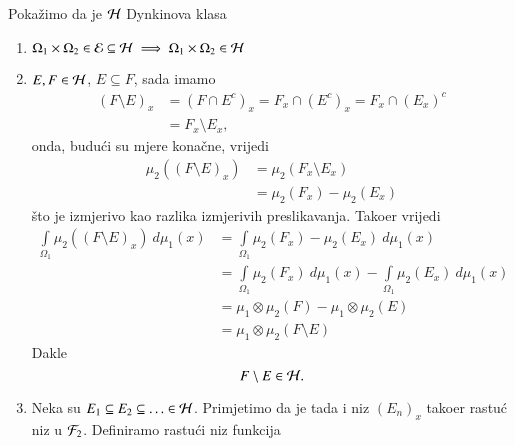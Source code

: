 \begin{rj}[\ref{zad:4.15}]
    Poka\v zimo da je $\mathcal{H}$ Dynkinova klasa
    \begin{enumerate}[label=(\roman*)]
        \item
        $\Omega_1 \times \Omega_2 \in \mathcal{E} \subseteq \mathcal{H} \implies \Omega_1 \times \Omega_2 \in \mathcal{H}$
        \item $E, F \in \mathcal{H}$, $E \subseteq F$, sada imamo
        \begin{equation*}
            \begin{aligned}
                (F \setminus E)_x &= (F \cap E^c)_x = F_x \cap (E^c)_x = F_x \cap (E_x)^c\\
                &= F_x \setminus E_x,
            \end{aligned}
        \end{equation*}
        onda, budu\' ci su mjere kona\v cne, vrijedi
        \begin{equation*}
            \begin{aligned}
                \mu_2 ((F \setminus E)_x) &= \mu_2 (F_x \setminus E_x)\\
                &= \mu_2 (F_x) - \mu_2 (E_x)
            \end{aligned}
        \end{equation*}
        \v sto je izmjerivo kao razlika izmjerivih preslikavanja.
        Tako\dj er vrijedi
        \begin{equation*}
            \begin{aligned}
                \int\limits_{\Omega_1} \mu_2 ((F \setminus E)_x) \: d \mu_1 (x) &= \int\limits_{\Omega_1} \mu_2 (F_x) - \mu_2 (E_x) \: d \mu_1 (x)\\
                &= \int\limits_{\Omega_1} \mu_2 (F_x) \: d \mu_1 (x) - \int\limits_{\Omega_1} \mu_2 (E_x) \: d \mu_1 (x)\\
                &= \mu_1 \otimes \mu_2 (F) - \mu_1 \otimes \mu_2 (E)\\
                &= \mu_1 \otimes \mu_2 (F \setminus E)
            \end{aligned}
        \end{equation*}
        Dakle
        \begin{equation*}
            F \setminus E \in \mathcal{H}.
        \end{equation*}
        \item
        Neka su $E_1 \subseteq E_2 \subseteq \ldots \in \mathcal{H}$.
        Primjetimo da je tada i niz $(E_n)_x$ tako\dj er rastu\' c niz u $\mathcal{F}_2$.
        Definiramo rastu\' ci niz funkcija
        \begin{equation*}

\end{equation*}
\end{enumerate}
\end{rj}
